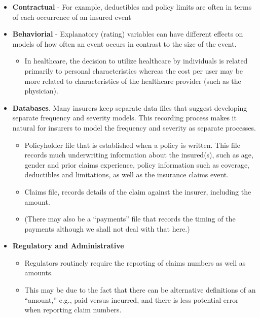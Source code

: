 \documentclass[]{book}
\providecommand{\tightlist}{%
  \setlength{\itemsep}{0pt}\setlength{\parskip}{0pt}}
\begin{document}
\begin{itemize}
\item
  \textbf{Contractual} - For example, deductibles and policy limits are
  often in terms of each occurrence of an insured event
\item
  \textbf{Behaviorial} - Explanatory (rating) variables can have
  different effects on models of how often an event occurs in contrast
  to the size of the event.

  \begin{itemize}
  \tightlist
  \item
    In healthcare, the decision to utilize healthcare by individuals is
    related primarily to personal characteristics whereas the cost per
    user may be more related to characteristics of the healthcare
    provider (such as the physician).
  \end{itemize}
\item
  \textbf{Databases}. Many insurers keep separate data files that
  suggest developing separate frequency and severity models. This
  recording process makes it natural for insurers to model the frequency
  and severity as separate processes.

  \begin{itemize}
  \item
    Policyholder file that is established when a policy is written. This
    file records much underwriting information about the insured(s),
    such as age, gender and prior claims experience, policy information
    such as coverage, deductibles and limitations, as well as the
    insurance claims event.
  \item
    Claims file, records details of the claim against the insurer,
    including the amount.
  \item
    (There may also be a ``payments'' file that records the timing of
    the payments although we shall not deal with that here.)
  \end{itemize}
\item
  \textbf{Regulatory and Administrative}

  \begin{itemize}
  \item
    Regulators routinely require the reporting of claims numbers as well
    as amounts.
  \item
    This may be due to the fact that there can be alternative
    definitions of an ``amount,'' e.g., paid versus incurred, and there
    is less potential error when reporting claim numbers.
  \end{itemize}
\end{itemize}
\end{document}
